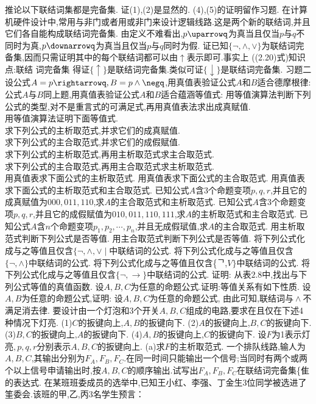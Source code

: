 {推论以下联结词集都是完备集.
证(1),(2)是显然的.
(4),(5)的证明留作习题.
在计算机硬件设计中,常用与非门或者用或非门来设计逻辑线路.这是两个新的联结词,并且它们各自能构成联结词完备集.
由定义不难看出,$p\uparrowq$为真当且仅当$p$与$q$不同时为真,$p\downarrowq$为真当且仅当$p$与$q$同时为假.
证已知$\{\neg,\wedge,\vee\}$为联结词完备集,因而只需证明其中的每个联结词都可以由$\uparrow$表示即可.事实上
((2.20)式)知识点:联结
词完备集
得证$\{\uparrow\}$是联结词完备集.类似可证$\{\downarrow\}$是联结词完备集.
{习题二}
设公式$A=p\rightarrowq,B=p\wedge\negq$,用真值表验证公式$A$和$B$适合德摩根律:
公式$A$与$B$同上题,用真值表验证公式$A$和$B$适合蕴涵等值式:
用等值演算法判断下列公式的类型,对不是重言式的可满足式,再用真值表法求出成真赋值.\\
用等值演算法证明下面等值式.\\
求下列公式的主析取范式,并求它们的成真赋值.\\
求下列公式的主合取范式,并求它们的成假赋值.\\
求下列公式的主析取范式,再用主析取范式求主合取范式.\\
求下列公式的主合取范式,再用主合取范式求主析取范式.\\
用真值表求下面公式的主析取范式.
用真值表求下面公式的主合取范式.
用真值表求下面公式的主析取范式和主合取范式.
已知公式$A$含3个命题变项$p,q,r$,并且它的成真赋值为$000,011,110$,求$A$的主合取范式和主析取范式.
已知公式$A$含3个命题变项$p,q,r$,并且它的成假赋值为$010,011,110,111$,求$A$的主析取范式和主合取范式.
已知公式$A$含$n$个命题变项$p_{1},p_{2},\cdots,p_{n}$,并且无成假珷值,求$A$的主合取范式.
用主析取范式判断下列公式是否等值.
用主合取范式判断下列公式是否等值.
将下列公式化成与之等值且仅含$\{\neg,\wedge,\vee\mid$中联结词的公式.
将下列公式化成与之等值且仅含$\{\neg,\wedge\}$中联结词的公式.
将下列公式化成与之等值且仅含\{ᄀ,$V\}$中联结词的公式.
将下列公式化成与之等值且仅含$\{\neg,\rightarrow\}$中联结词的公式.
证明:
从表$2.8$中,找出与下列公式等值的真值函数.
设$A,B,C$为任意的命题公式.证明:等值关系有如下性质.
设$A,B$为任意的命题公式,证明:
设$A,B,C$为任意的命题公式,
由此可知,联结词$\mathrm{与}\wedge$不满足消去律.
要设计由一个灯泡和3个开关$A,B,C$组成的电路,要求在且仅在下述4种情况下灯亮.
(1)$C$的扳键向上,$A,B$的扳键向下.
(2)$A$的扳键向上,$B,C$的扳键向下.
(3)$B,C$的扳键向上,$A$的扳键向下.
(4)$A,B$的扳键向上,$C$的扳键向下.
设$F$为1表示灯亮$,p,q,r$分别表示$A,B,C$的扳键向上.
(a)求$F$的主析取范式.
一个排队线路,输人为$A,B,C$,其输出分别为$F_{A},F_{B},F_{C}$.在同一时间只能输出一个信号;当同时有两个或两个以上信号申请输出时,按$A,B,C$的顺序输出.试写出$F_{A},F_{B},F_{C}$在联结词完备集\{隹的表达式.
在某班班委成员的选举中,已知王小红、李强、丁金生3位同学被选进了筀委会.该班的甲,乙,丙3名学生预言：
}
